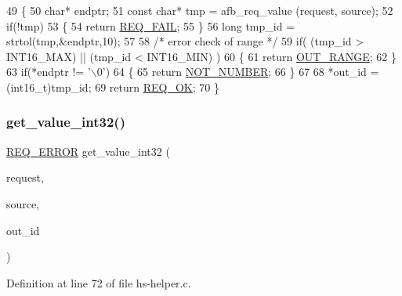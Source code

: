 \begin{DoxyCode}
49 \{
50     \textcolor{keywordtype}{char}* endptr;
51     \textcolor{keyword}{const} \textcolor{keywordtype}{char}* tmp = afb\_req\_value (request, source);
52     \textcolor{keywordflow}{if}(!tmp)
53     \{
54         \textcolor{keywordflow}{return} \hyperlink{hs-helper_8h_aa49f1dbbf26f01627a5737cf43aad899a96a855966bc63045222b3dcac524cee1}{REQ\_FAIL};
55     \}
56     \textcolor{keywordtype}{long} tmp\_id = strtol(tmp,&endptr,10);
57 
58     \textcolor{comment}{/* error check of range */}
59     \textcolor{keywordflow}{if}( (tmp\_id > INT16\_MAX) || (tmp\_id < INT16\_MIN) )
60     \{
61         \textcolor{keywordflow}{return} \hyperlink{hs-helper_8h_aa49f1dbbf26f01627a5737cf43aad899add1c84bf80c5f80741ee8f37fef1e12b}{OUT\_RANGE};
62     \}
63     \textcolor{keywordflow}{if}(*endptr != \textcolor{charliteral}{'\(\backslash\)0'})
64     \{
65         \textcolor{keywordflow}{return} \hyperlink{hs-helper_8h_aa49f1dbbf26f01627a5737cf43aad899aa223eed65c9bee2bf1f4cdecaf90d66a}{NOT\_NUMBER};
66     \}
67 
68     *out\_id = (int16\_t)tmp\_id;
69     \textcolor{keywordflow}{return} \hyperlink{hs-helper_8h_aa49f1dbbf26f01627a5737cf43aad899ab093abb14c097b3b7719debb04d5e8ee}{REQ\_OK};
70 \}
\end{DoxyCode}
\mbox{\label{hs-helper_8h_ac5b0370643c520377afd3fd4891918d2}} 
\subsubsection{\texorpdfstring{get\+\_\+value\+\_\+int32()}{get\_value\_int32()}}
{\footnotesize\ttfamily \hyperlink{hs-helper_8h_aa49f1dbbf26f01627a5737cf43aad899}{R\+E\+Q\+\_\+\+E\+R\+R\+OR} get\+\_\+value\+\_\+int32 (\begin{DoxyParamCaption}\item[{const struct afb\+\_\+req}]{request,  }\item[{const char $\ast$}]{source,  }\item[{int32\+\_\+t $\ast$}]{out\+\_\+id }\end{DoxyParamCaption})}



Definition at line 72 of file hs-\/helper.\+c.


